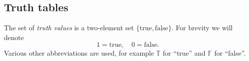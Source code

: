 \subsection{Truth tables}
The set of \emph{truth values} is a two-element set $\{\text{true}, \text{false}\}$.
For brevity we will denote
\[
1 = \text{true}, \quad 0 = \text{false}.
\]
Various other abbreviations are used, for example $\mathbb{T}$ for ``true'' and $\mathbb{F}$ for ``false''.
